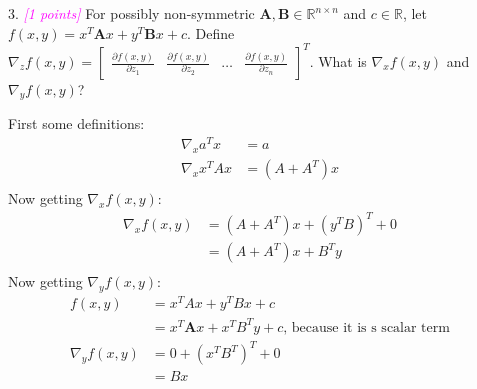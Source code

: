 \documentclass{article}
\newcommand{\field}[1]{\mathbb{#1}}
\newcommand{\1}{\mathbf{1}}
\newcommand{\R}{\field{R}} %
\newcommand{\mat}[1]{\boldsymbol{#1}} %
\newcommand{\grade}[1]{\small\textcolor{magenta}{\emph{[#1 points]}} \normalsize}
\begin{document}
\newpage







{\color{blue}
3. \grade{1} For possibly non-symmetric $\mat{A}, \mat{B} \in \R^{n \times n}$ and $c \in \R$, let $f(x, y) = x^T \mat{A} x + y^T \mat{B} x + c$. Define $\nabla_z f(x,y) = \begin{bmatrix} \frac{\partial f(x,y)}{\partial z_1} & \frac{\partial f(x,y)}{\partial z_2} & \dots & \frac{\partial f(x,y)}{\partial z_n} \end{bmatrix}^T$.  What is $\nabla_x f(x,y)$ and $\nabla_y f(x,y)$? \\
}

First some definitions:
\begin{align}
    \nabla_x a^T x & = a \\
    \nabla_x x^T A x & = (A + A^T) x \\
\end{align}
Now getting $\nabla_x f(x,y)$:
\begin{align}
    \nabla_x f(x,y) & = (A+A^T)x + (y^TB)^T + 0 \\
    & = (A+A^T)x + B^Ty  \\
\end{align}
Now getting $\nabla_y f(x,y)$:
\begin{align}
    f(x,y) & = x^TAx + y^TB x + c \\
    & = x^T \mat{A} x + x^TB^Ty + c \text{, because it is s scalar term}\\
    \nabla_y f(x,y) & = 0 + (x^TB^T)^T +0  \\
    & = Bx  \\
\end{align}






\newpage
\end{document}
